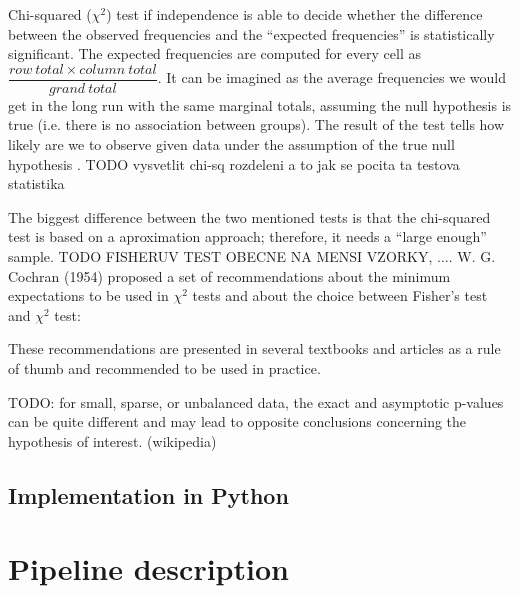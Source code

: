 Chi-squared ($\chi^{2}$) test if independence is able to decide whether the difference between the observed frequencies and the ``expected frequencies'' is statistically significant. The expected frequencies are computed for every cell as 
$\dfrac{row\: total\times column\:total}{grand\:total}$.
It can be imagined as the average frequencies we would get in the long run with the same marginal totals, assuming the null hypothesis is true (i.e. there is no association between groups). The result of the test tells how likely are we to observe given data under the assumption of the true null hypothesis \cite{bland}. TODO vysvetlit chi-sq rozdeleni a to jak se pocita ta testova statistika

The biggest difference between the two mentioned tests is that the chi-squared test is based on a aproximation approach; therefore, it needs a ``large enough'' sample. TODO FISHERUV TEST OBECNE NA MENSI VZORKY, .... W. G. Cochran (1954) \cite{cochran} proposed a set of recommendations about the minimum expectations to be used in $\chi^{2}$ tests and about the choice between Fisher's test and $\chi^{2}$ test:


These recommendations are presented in several textbooks and articles as a rule of thumb \cite{} and recommended to be used in practice.


TODO: for small, sparse, or unbalanced data, the exact and asymptotic p-values can be quite different and may lead to opposite conclusions concerning the hypothesis of interest. (wikipedia)

\subsection{Implementation in Python}


\section{Pipeline description}





